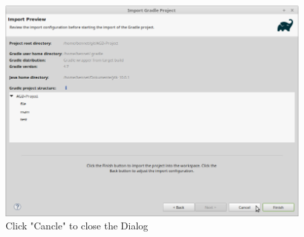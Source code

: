 \begin{figure}[H]
	\includegraphics[width=\textwidth]{setup-parts/pictures/eclipse-import-8.png}
	\caption{Click "Cancle" to close the Dialog}
\end{figure}
